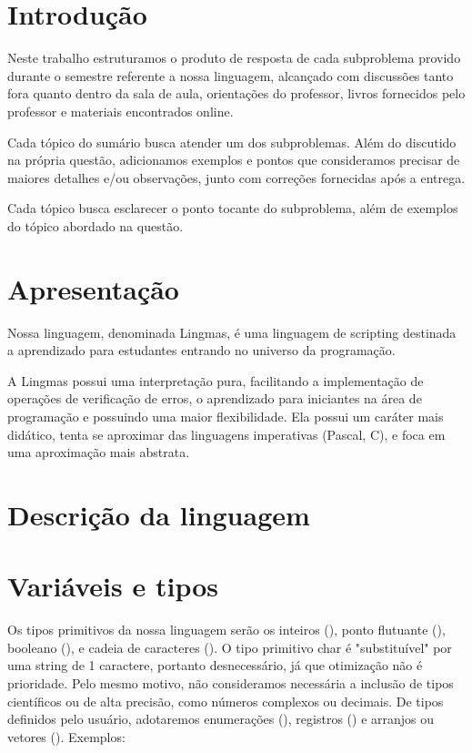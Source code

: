 \section{Introdução}
Neste trabalho estruturamos o produto de resposta de cada subproblema provido
durante o semestre referente a nossa linguagem, alcançado com discussões tanto
fora quanto dentro da sala de aula, orientações do professor, livros fornecidos
pelo professor e materiais encontrados online.

Cada tópico do sumário busca atender um dos subproblemas. Além do discutido na
própria questão, adicionamos exemplos e pontos que consideramos precisar de
maiores detalhes e/ou observações, junto com correções fornecidas após a
entrega.

Cada tópico busca esclarecer o ponto tocante do subproblema, além de exemplos
do tópico abordado na questão.

\section{Apresentação}
Nossa linguagem, denominada Lingmas, é uma linguagem de scripting destinada a
aprendizado para estudantes entrando no universo da programação.

A Lingmas possui uma interpretação pura, facilitando a implementação de
operações de verificação de erros, o aprendizado para iniciantes na área de
programação e possuindo uma maior flexibilidade. Ela possui um caráter mais
didático, tenta se aproximar das linguagens imperativas (Pascal, C), e foca em
uma aproximação mais abstrata.

\section{Descrição da linguagem}

\section{Variáveis e tipos}

Os tipos primitivos da nossa linguagem serão os inteiros (), ponto flutuante
(), booleano (), e cadeia de caracteres (). O tipo primitivo
char é "substituível" por uma string de 1 caractere, portanto desnecessário, já
que otimização não é prioridade. Pelo mesmo motivo, não consideramos necessária
a inclusão de tipos científicos ou de alta precisão, como números complexos ou
decimais. De tipos definidos pelo usuário, adotaremos enumerações (),
registros () e arranjos ou vetores (). Exemplos:

